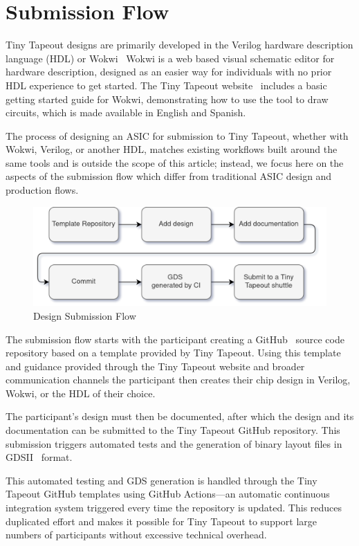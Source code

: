 \section{Submission Flow}
\label{sec:design_flow}

Tiny Tapeout designs are primarily developed in the Verilog hardware description language (HDL) or Wokwi~\cite{wokwi}
Wokwi is a web based visual schematic editor for hardware description, designed as an easier way for individuals with no prior HDL experience to get started.
The Tiny Tapeout website~\cite{tinytapeout} includes a basic getting started guide for Wokwi, demonstrating how to use the tool to draw circuits, which is made available in English and Spanish.

The process of designing an ASIC for submission to Tiny Tapeout, whether with Wokwi, Verilog, or another HDL, matches existing workflows built around the same tools and is outside the scope of this article; instead, we focus here on the aspects of the submission flow which differ from traditional ASIC design and production flows.

\begin{figure}[!t]
\centering
\includegraphics[width=\columnwidth]{./Figs/submission_flow.png}
\caption{Design Submission Flow}
\label{fig:submission_flow}
\end{figure}

The submission flow starts with the participant creating a GitHub~\cite{github} source code repository based on a template provided by Tiny Tapeout. Using this template and guidance provided through the Tiny Tapeout website and broader communication channels the participant then creates their chip design in Verilog, Wokwi, or the HDL of their choice.

The participant's design must then be documented, after which the design and its documentation can be submitted to the Tiny Tapeout GitHub repository. This submission triggers automated tests and the generation of binary layout files in GDSII~\cite{gds} format.

This automated testing and GDS generation is handled through the Tiny Tapeout GitHub templates\cite{verilogtemplate} using GitHub Actions\cite{githubactions}---an automatic continuous integration system triggered every time the repository is updated. This reduces duplicated effort and makes it possible for Tiny Tapeout to support large numbers of participants without excessive technical overhead.

